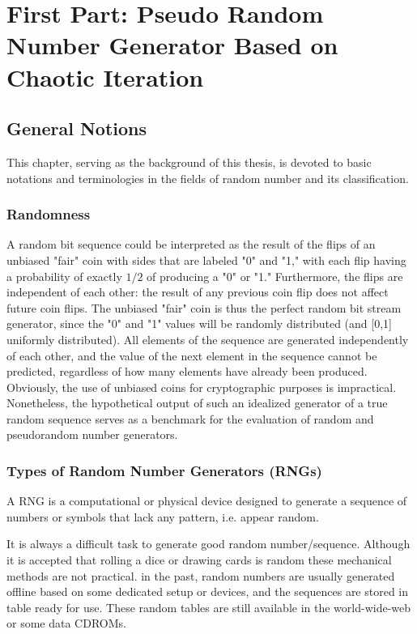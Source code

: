 \part{First Part: Pseudo Random Number Generator Based on Chaotic Iteration}
\chapter{General Notions}
\label{General Notions}
\minitoc
 
This chapter, serving as the background of this thesis,  
is devoted to basic notations and terminologies in the fields of random number and its classification.


\section{Randomness}
A random bit sequence could be interpreted as the result of the flips of an unbiased "fair" coin with sides
that are labeled "0" and "1," with each flip having a probability of exactly $1/2$ of producing a "0" or "1."
Furthermore, the flips are independent of each other: the result of any previous coin flip does not affect
future coin flips. The unbiased "fair" coin is thus the perfect random bit stream generator, since the "0"
and "1" values will be randomly distributed (and [0,1] uniformly distributed). All elements of the
sequence are generated independently of each other, and the value of the next element in the sequence
cannot be predicted, regardless of how many elements have already been produced.
Obviously, the use of unbiased coins for cryptographic purposes is impractical. Nonetheless, the
hypothetical output of such an idealized generator of a true random sequence serves as a benchmark for
the evaluation of random and pseudorandom number generators.~\cite{ANDREW2008}

\section{Types of Random Number Generators (RNGs)}
A RNG is a computational or physical device designed to generate a sequence of numbers or symbols that lack any pattern, i.e. appear random.

It is always a difficult task to generate good random number/sequence. Although it is accepted that rolling a dice or drawing cards is random these mechanical methods are not practical. in the past, random numbers are usually generated offline based on some dedicated setup or devices, and the sequences are stored in table ready for use. These random tables are still available in the world-wide-web or some data CDROMs.

